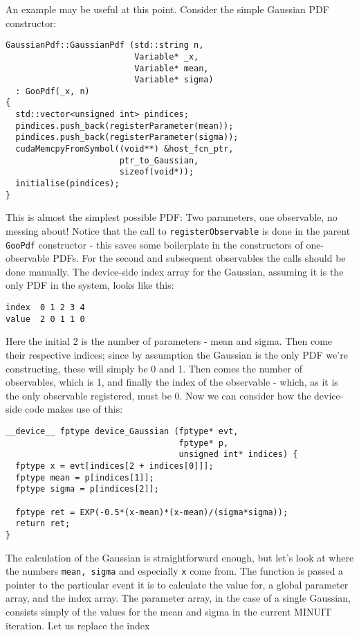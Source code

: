 \documentclass[12pt,pdflatex]{article}
\begin{document}
An example may be useful at this point. Consider the simple Gaussian PDF constructor:
\begin{verbatim}
GaussianPdf::GaussianPdf (std::string n, 
                          Variable* _x, 
                          Variable* mean, 
                          Variable* sigma) 
  : GooPdf(_x, n) 
{
  std::vector<unsigned int> pindices;
  pindices.push_back(registerParameter(mean));
  pindices.push_back(registerParameter(sigma));
  cudaMemcpyFromSymbol((void**) &host_fcn_ptr, 
                       ptr_to_Gaussian, 
                       sizeof(void*));
  initialise(pindices); 
}
\end{verbatim}
This is almost the simplest possible PDF: Two parameters, one observable, 
no messing about! Notice that the call to \verb|registerObservable| is done
in the parent \verb|GooPdf| constructor - this saves some boilerplate
in the constructors of one-observable PDFs. For the second and subsequent
observables the calls should be done manually. The device-side index array
for the Gaussian, assuming it is the only PDF in the system, looks like this:
\begin{verbatim}
index  0 1 2 3 4
value  2 0 1 1 0
\end{verbatim}
Here the initial 2 is the number of parameters - mean and sigma. Then come their
respective indices; since by assumption the Gaussian is the only PDF we're constructing,
these will simply be 0 and 1. Then comes the number of observables, which is 1, and
finally the index of the observable - which, as it is the only observable registered,
must be 0. Now we can consider how the device-side code makes use of this:
\begin{verbatim}
__device__ fptype device_Gaussian (fptype* evt, 
                                   fptype* p, 
                                   unsigned int* indices) {
  fptype x = evt[indices[2 + indices[0]]]; 
  fptype mean = p[indices[1]];
  fptype sigma = p[indices[2]];

  fptype ret = EXP(-0.5*(x-mean)*(x-mean)/(sigma*sigma));
  return ret; 
}
\end{verbatim}
The calculation of the Gaussian is straightforward enough, but let's look
at where the numbers \verb|mean, sigma| and especially \verb|x| come from. 
The function is passed a pointer to the particular event it is to calculate
the value for, a global parameter array, and the index array. The parameter
array, in the case of a single Gaussian, consists simply of the values for
the mean and sigma in the current MINUIT iteration. Let us replace the index
\end{document}
